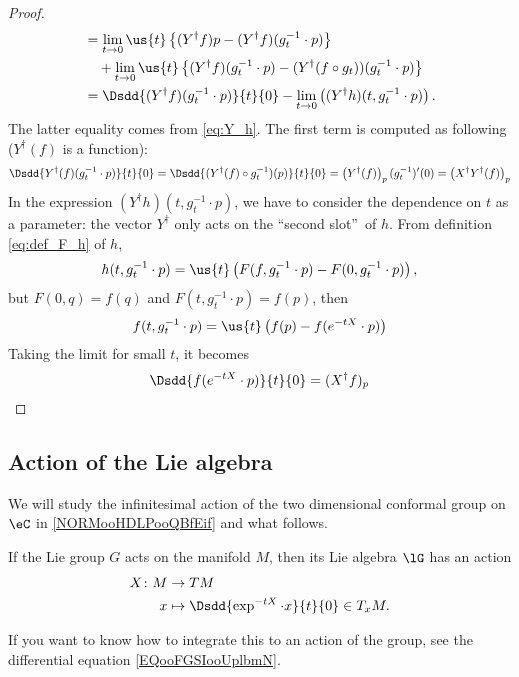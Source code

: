 \begin{proof}
\begin{equation}
\begin{aligned}
                     &=\lim_{t\to 0}\us{t}\left\{ (Y^{\dag} f)p-(Y^{\dag} f)(g_t^{-1}\cdot p) \right\}\\
		     &\quad+\lim_{t\to 0}\us{t}\left\{ (Y^{\dag} f)(g_t^{-1}\cdot p)
		                                      -(Y^{\dag}(f\circ g_t) )(g_t^{-1}\cdot p)
					       \right\}\\
   &=\Dsdd{ (Y^{\dag} f)(g_t^{-1}\cdot p) }{t}{0}-\lim_{t\to 0} 
                \left(    (Y^{\dag} h)(t,g_t^{-1}\cdot p)       \right).
\end{aligned}
\end{equation}
The latter equality comes from  \eqref{eq:Y_h}. The first term is computed as following ($Y^{\dag}(f)$ is a function):
\begin{equation}
\Dsdd{ Y^{\dag}(f)(g_t^{-1}\cdot p) }{t}{0}=\Dsdd{ (Y^{\dag}(f)\circ g_t^{-1})(p) }{t}{0}
                                        =\left( Y^{\dag}(f) \right)_p(g_t^{-1})'(0)
					=\left( X^{\dag} Y^{\dag}(f)\right)_p
\end{equation}
In the expression $(Y^{\dag} h)(t,g_t^{-1}\cdot p)$, we have to consider the dependence on $t$ as a parameter: the vector $Y^{\dag}$ only acts on the ``second slot''\ of $h$. From definition \eqref{eq:def_F_h} of $h$,
\[
   h(t,g_t^{-1}\cdot p)=\us{t}\left(  F(f,g_t^{-1}\cdot p)-F(0,g_t^{-1}\cdot p)  
                             \right),
\]
but $F(0,q)=f(q)$ and $F(t,g_t^{-1}\cdot p)=f(p)$, then
\[
  f(t,g_t^{-1}\cdot p)=\us{t}\left( f(p)-f(e^{-tX}\cdot p) \right)
\]
Taking the limit for small $t$, it becomes 
\[
  \Dsdd{f(e^{-tX}\cdot p)}{t}{0}=(X^{\dag} f)_p
\]

\end{proof}

\subsection{Action of the Lie algebra}

\begin{normaltext}
    We will study the infinitesimal action of the two dimensional conformal group on $\eC$ in \ref{NORMooHDLPooQBfEif} and what follows.
\end{normaltext}

\begin{definition}       \label{DEFooUYOZooWdcClz}
    If the Lie group \( G\) acts on the manifold \( M\), then its Lie algebra \( \lG\) has an action
    \begin{equation}
        \begin{aligned}
            X\colon M&\to TM \\
            x&\mapsto \Dsdd{  \exp^{-tX}\cdot x }{t}{0}\in T_xM.
        \end{aligned}
    \end{equation}
\end{definition}
If you want to know how to integrate this to an action of the group, see the differential equation \eqref{EQooFGSIooUplbmN}.

